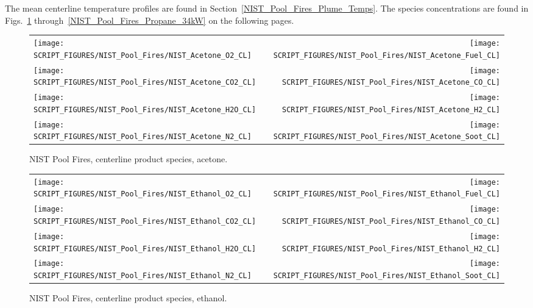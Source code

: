 The mean centerline temperature profiles are found in Section~\ref{NIST_Pool_Fires_Plume_Temps}. The species concentrations are found in Figs.~\ref{NIST_Pool_Fires_Acetone} through~\ref{NIST_Pool_Fires_Propane_34kW} on the following pages.

\begin{figure}[p]
\begin{tabular*}{\textwidth}{l@{\extracolsep{\fill}}r}
\texttt{[image: SCRIPT\_FIGURES/NIST\_Pool\_Fires/NIST\_Acetone\_O2\_CL]} &
\texttt{[image: SCRIPT\_FIGURES/NIST\_Pool\_Fires/NIST\_Acetone\_Fuel\_CL]} \\
\texttt{[image: SCRIPT\_FIGURES/NIST\_Pool\_Fires/NIST\_Acetone\_CO2\_CL]} &
\texttt{[image: SCRIPT\_FIGURES/NIST\_Pool\_Fires/NIST\_Acetone\_CO\_CL]}    \\
\texttt{[image: SCRIPT\_FIGURES/NIST\_Pool\_Fires/NIST\_Acetone\_H2O\_CL]} &
\texttt{[image: SCRIPT\_FIGURES/NIST\_Pool\_Fires/NIST\_Acetone\_H2\_CL]} \\
\texttt{[image: SCRIPT\_FIGURES/NIST\_Pool\_Fires/NIST\_Acetone\_N2\_CL]} &
\texttt{[image: SCRIPT\_FIGURES/NIST\_Pool\_Fires/NIST\_Acetone\_Soot\_CL]}
\end{tabular*}
\caption[NIST Pool Fires, centerline product species, acetone]{NIST Pool Fires, centerline product species, acetone.}
\label{NIST_Pool_Fires_Acetone}
\end{figure}

\begin{figure}[p]
\begin{tabular*}{\textwidth}{l@{\extracolsep{\fill}}r}
\texttt{[image: SCRIPT\_FIGURES/NIST\_Pool\_Fires/NIST\_Ethanol\_O2\_CL]} &
\texttt{[image: SCRIPT\_FIGURES/NIST\_Pool\_Fires/NIST\_Ethanol\_Fuel\_CL]} \\
\texttt{[image: SCRIPT\_FIGURES/NIST\_Pool\_Fires/NIST\_Ethanol\_CO2\_CL]} &
\texttt{[image: SCRIPT\_FIGURES/NIST\_Pool\_Fires/NIST\_Ethanol\_CO\_CL]}    \\
\texttt{[image: SCRIPT\_FIGURES/NIST\_Pool\_Fires/NIST\_Ethanol\_H2O\_CL]} &
\texttt{[image: SCRIPT\_FIGURES/NIST\_Pool\_Fires/NIST\_Ethanol\_H2\_CL]} \\
\texttt{[image: SCRIPT\_FIGURES/NIST\_Pool\_Fires/NIST\_Ethanol\_N2\_CL]} &
\texttt{[image: SCRIPT\_FIGURES/NIST\_Pool\_Fires/NIST\_Ethanol\_Soot\_CL]}
\end{tabular*}
\caption[NIST Pool Fires, centerline product species, ethanol]{NIST Pool Fires, centerline product species, ethanol.}
\label{NIST_Pool_Fires_Ethanol}
\end{figure}

